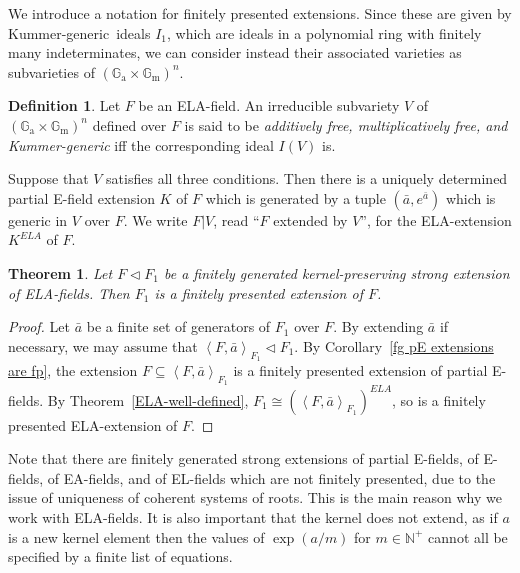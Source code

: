 \documentclass[12pt]{amsart}
\newtheorem{theorem}[prop]{Theorem}
\theoremstyle{definition}
\newtheorem{defn}[prop]{Definition}
\begin{document}
We introduce a notation for finitely presented extensions. Since these are given by {Kummer-generic}\ ideals $I_1$, which are ideals in a polynomial ring with finitely many indeterminates, we can consider instead their associated varieties as subvarieties of $({\ensuremath{\mathbb{G}_\mathrm{a}}} {\ensuremath{\times}} {\ensuremath{\mathbb{G}_\mathrm{m}}})^n$.
\begin{defn}
  Let $F$ be an ELA-field. An irreducible subvariety $V$ of $({\ensuremath{\mathbb{G}_\mathrm{a}}} {\ensuremath{\times}} {\ensuremath{\mathbb{G}_\mathrm{m}}})^n$ defined over $F$ is said to be \emph{additively free, multiplicatively free, and {Kummer-generic}} iff the corresponding ideal $I(V)$ is. 
\end{defn}
Suppose that $V$ satisfies all three conditions. Then there is a uniquely determined partial E-field extension $K$ of $F$ which is generated by a tuple $({{\ensuremath{\bar{a}}}},e^{{\ensuremath{\bar{a}}}})$ which is generic in $V$ over $F$. We write $F|V$, read ``$F$ extended by $V$'', for the ELA-extension $K^{ELA}$ of $F$.

\begin{theorem}\label{aleph0-stability}
  Let $F {\ensuremath{\lhd}} F_1$ be a finitely generated kernel-preserving strong extension of ELA-fields. Then $F_1$ is a finitely presented extension of $F$.
\end{theorem}

\begin{proof}
  Let ${{\ensuremath{\bar{a}}}}$ be a finite set of generators of $F_1$ over $F$. By extending ${{\ensuremath{\bar{a}}}}$ if necessary, we may assume that ${\ensuremath{\left\langle {F,{{\ensuremath{\bar{a}}}}} \right\rangle}}_{F_1} {\ensuremath{\lhd}} F_1$. By Corollary~\ref{fg pE extensions are fp}, the extension $F {\subseteq} {\ensuremath{\left\langle {F,{{\ensuremath{\bar{a}}}}} \right\rangle}}_{F_1}$ is a finitely presented extension of partial E-fields. By Theorem~\ref{ELA-well-defined}, $F_1 {\cong} ({\ensuremath{\left\langle {F,{{\ensuremath{\bar{a}}}}} \right\rangle}}_{F_1})^{ELA}$, so is a finitely presented ELA-extension of $F$.
\end{proof}

Note that there are finitely generated strong extensions of partial E-fields, of E-fields, of EA-fields, and of EL-fields which are not finitely presented, due to the issue of uniqueness of coherent systems of roots. This is the main reason why we work with ELA-fields. It is also important that the kernel does not extend, as if $a$ is a new kernel element then the values of $\exp(a/m)$ for $m \in {\ensuremath{\mathbb{N}}}^+$ cannot all be specified by a finite list of equations.
\end{document}
